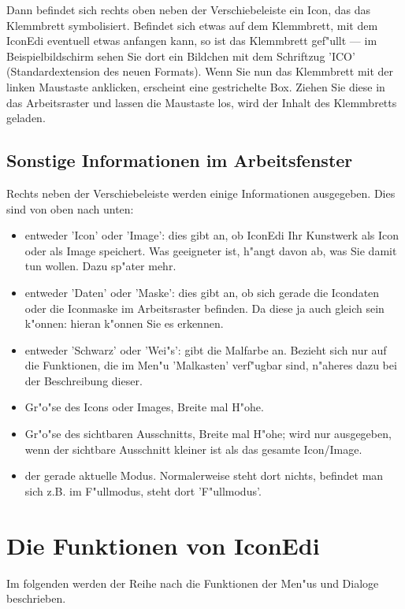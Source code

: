 Dann befindet sich rechts oben neben der Verschiebeleiste ein Icon, 
das das Klemmbrett symbolisiert. Befindet sich etwas auf dem 
Klemmbrett, mit dem IconEdi eventuell etwas anfangen kann, so ist 
das Klemmbrett gef"ullt --- im Beispielbildschirm sehen Sie dort ein 
Bildchen mit dem Schriftzug 'ICO' (Standardextension des neuen 
Formats). Wenn Sie nun das Klemmbrett mit der linken Maustaste 
anklicken, erscheint eine gestrichelte Box. Ziehen Sie diese in das 
Arbeitsraster und lassen die Maustaste los, wird der Inhalt des 
Klemmbretts geladen.

\subsection{Sonstige Informationen im Arbeitsfenster} 
Rechts neben der Verschiebeleiste werden einige Informationen 
ausgegeben. Dies sind von oben nach unten:
\begin{itemize}
\item entweder 'Icon' oder 'Image': dies gibt an, ob IconEdi
Ihr Kunstwerk als Icon oder als Image speichert. Was geeigneter 
ist, h"angt davon ab, was Sie damit tun wollen. Dazu sp"ater mehr.
\item entweder 'Daten' oder 'Maske': dies gibt an, ob sich gerade 
die Icondaten oder die Iconmaske im Arbeitsraster befinden. Da 
diese ja auch gleich sein k"onnen: hieran k"onnen Sie es erkennen.
\item entweder 'Schwarz' oder 'Wei"s': gibt die Malfarbe an. 
Bezieht sich nur auf die Funktionen, die im Men"u 'Malkasten' 
verf"ugbar sind, n"aheres dazu bei der Beschreibung dieser.
\item Gr"o"se des Icons oder Images, Breite mal H"ohe. 
\item Gr"o"se des sichtbaren Ausschnitts, Breite mal H"ohe; wird nur 
ausgegeben, wenn der sichtbare Ausschnitt kleiner ist als das 
gesamte Icon/Image.
\item der gerade aktuelle Modus. Normalerweise steht dort nichts,
befindet man sich z.B. im F"ullmodus, steht dort 'F"ullmodus'.
\end{itemize}

\newpage

\section{Die Funktionen von IconEdi}
Im folgenden werden der Reihe nach die Funktionen der Men"us und 
Dialoge beschrieben.

